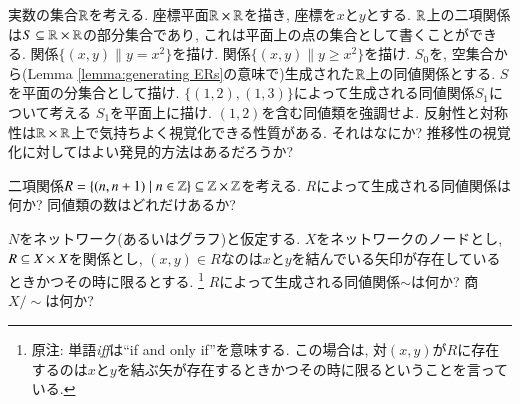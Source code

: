 \begin{exercise}
実数の集合$\RR$を考える. 座標平面$\RR\times\RR$を描き, 座標を$x$と$y$とする. $\RR$上の二項関係は$S\ss\RR\times\RR$の部分集合であり, これは平面上の点の集合として書くことができる.
\sexc 関係$\{(x,y)\|y=x^2\}$を描け.
\next 関係$\{(x,y)\|y\geq x^2\}$を描け.
\next $S_0$を, 空集合から(Lemma \ref{lemma:generating ERs}の意味で)生成された$\RR$上の同値関係とする. $S$を平面の分集合として描け. 
\next $\{(1,2),(1,3)\}$によって生成される同値関係$S_1$について考える $S_1$を平面上に描け. $(1,2)$を含む同値類を強調せよ.
\next 反射性と対称性は$\RR\times\RR$上で気持ちよく視覚化できる性質がある. それはなにか?
\next 推移性の視覚化に対してはよい発見的方法はあるだろうか?
\endsexc
\end{exercise}

\begin{exercise}
二項関係$R=\{(n,n+1)\|n\in\ZZ\}\ss\ZZ\times\ZZ$を考える. 
\sexc $R$によって生成される同値関係は何か? 
\next 同値類の数はどれだけあるか?
\endsexc
\end{exercise}

\begin{exercise}
$N$をネットワーク(あるいはグラフ)と仮定する. $X$をネットワークのノードとし, $R\ss X\times X$を関係とし, $(x,y)\in R$なのは$x$と$y$を結んでいる矢印が存在しているときかつその時に限るとする. 
\footnote{原注: 単語\emph{iff}は``if and only if''を意味する. この場合は, 対$(x,y)$が$R$に存在するのは$x$と$y$を結ぶ矢が存在するときかつその時に限るということを言っている.}
\sexc $R$によって生成される同値関係$\sim$は何か?
\next 商$X/\sim$は何か?
\endsexc
\end{exercise}


